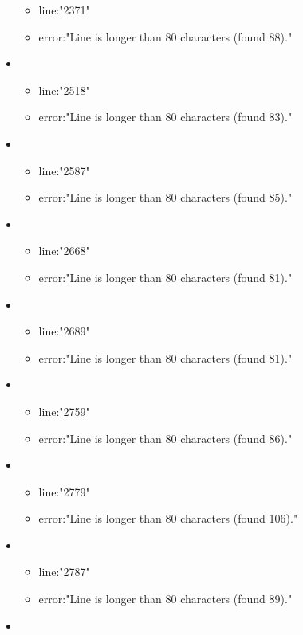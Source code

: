 \begin{itemize}
\begin{itemize}
		\item line:"2371" 
		\item error:"Line is longer than 80 characters (found 88)." 
	\end{itemize}
	\item 
	\begin{itemize} 
		\item line:"2518" 
		\item error:"Line is longer than 80 characters (found 83)." 
	\end{itemize}
	\item 
	\begin{itemize} 
		\item line:"2587" 
		\item error:"Line is longer than 80 characters (found 85)." 
	\end{itemize}
	\item 
	\begin{itemize} 
		\item line:"2668" 
		\item error:"Line is longer than 80 characters (found 81)." 
	\end{itemize}
	\item 
	\begin{itemize} 
		\item line:"2689" 
		\item error:"Line is longer than 80 characters (found 81)." 
	\end{itemize}
	\item 
	\begin{itemize} 
		\item line:"2759" 
		\item error:"Line is longer than 80 characters (found 86)." 
	\end{itemize}
	\item 
	\begin{itemize} 
		\item line:"2779" 
		\item error:"Line is longer than 80 characters (found 106)." 
	\end{itemize}
	\item 
	\begin{itemize} 
		\item line:"2787" 
		\item error:"Line is longer than 80 characters (found 89)." 
	\end{itemize}
	\item 
	\begin{itemize} 

\end{itemize}
\end{itemize}
